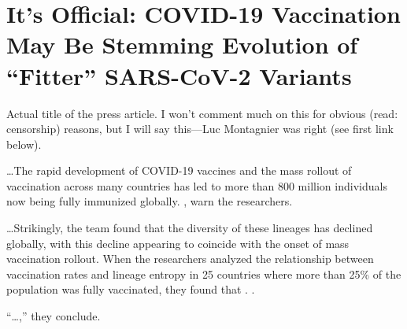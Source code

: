 \chapter{It's Official: COVID-19 Vaccination May Be Stemming Evolution of \enquote{Fitter} SARS-CoV-2 Variants}

\begin{refsection}

Actual title of the press article. I won't comment much on this for obvious (read: censorship) reasons, but I will say this---Luc Montagnier was right (see first link below).\textsuperscript{\cite{url79c93b91}}

\begin{tcolorbox}[quote]

\dots{}The rapid development of COVID-19 vaccines and the mass rollout of vaccination across many countries has led to more than 800 million individuals now being fully immunized globally. , warn the researchers.\textsuperscript{\cite{url60c38115}}

\end{tcolorbox}

\begin{tcolorbox}[quote]

\dots{}Strikingly, the team found that the diversity of these lineages has declined globally, with this decline appearing to coincide with the onset of mass vaccination rollout. When the researchers analyzed the relationship between vaccination rates and lineage entropy in 25 countries where more than 25\% of the population was fully vaccinated, they found that . .\textsuperscript{\cite{url60c38115}}

\end{tcolorbox}

\begin{tcolorbox}[quote]

\enquote{\dots{},} they conclude.\textsuperscript{\cite{url60c38115}}

\end{tcolorbox}

\printbibliography[heading=subbibliography]

\end{refsection}